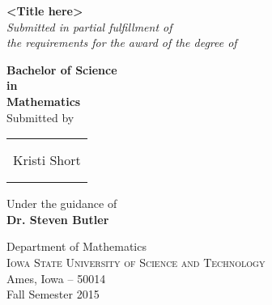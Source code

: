 \begin{titlepage}

\begin{center}

\Huge \textbf {<Title here>}\\[0.5in]

       \small \emph{Submitted in partial fulfillment of\\
        the requirements for the award of the degree of}
        \vspace{.2in}

       {\bf Bachelor of Science \\in\\ Mathematics}\\[0.5in]

\normalsize Submitted by \\
\begin{table}[h]
\centering
\begin{tabular}{c}\hline \\
\\
Kristi Short \\ \\ \\ \hline 
\end{tabular}
\end{table}

\vspace{.1in}
Under the guidance of\\
{\textbf{Dr. Steven Butler}}\\[0.2in]

\vfill

\Large{Department of Mathematics}\\
\normalsize
\textsc{Iowa State University of Science and Technology}\\
Ames, Iowa -- 50014 \\
\vspace{0.2cm}
Fall Semester 2015

\end{center}

\end{titlepage}
